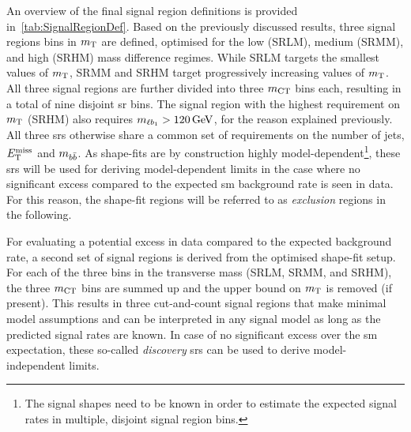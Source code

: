 An overview of the final signal region definitions is provided in~\cref{tab:SignalRegionDef}. Based on the previously discussed results, three signal regions bins in $m_{\textrm{T}}$ are defined, optimised for the low (SRLM), medium (SRMM), and high (SRHM) mass difference regimes. While SRLM targets the smallest values of $m_{\textrm{T}}$, SRMM and SRHM target progressively increasing values of $m_{\textrm{T}}$. All three signal regions are further divided into three $m_{\textrm{CT}}$ bins each, resulting in a total of nine disjoint \gls{sr} bins. The signal region with the highest requirement on $m_{\textrm{T}}$ (SRHM) also requires $\mlb>\SI{120}{\GeV}$, for the reason explained previously. All three \glspl{sr} otherwise share a common set of requirements on the number of jets, $E_{\textrm{T}}^{\textrm{miss}}$ and $m_{b\bar{b}}$. As shape-fits are by construction highly model-dependent\footnote{The signal shapes need to be known in order to estimate the expected signal rates in multiple, disjoint signal region bins.}, these \glspl{sr} will be used for deriving model-dependent limits in the case where no significant excess compared to the expected \gls{sm} background rate is seen in data. For this reason, the shape-fit regions will be referred to as \textit{exclusion} regions in the following.

For evaluating a potential excess in data compared to the expected background rate, a second set of signal regions is derived from the optimised shape-fit setup. For each of the three bins in the transverse mass (SRLM, SRMM, and SRHM), the three $m_{\textrm{CT}}$ bins are summed up and the upper bound on $m_{\textrm{T}}$ is removed (if present). This results in three cut-and-count signal regions that make minimal model assumptions and can be interpreted in any signal model as long as the predicted signal rates are known. In case of no significant excess over the \gls{sm} expectation, these so-called \textit{discovery} \glspl{sr} can be used to derive model-independent limits. 

